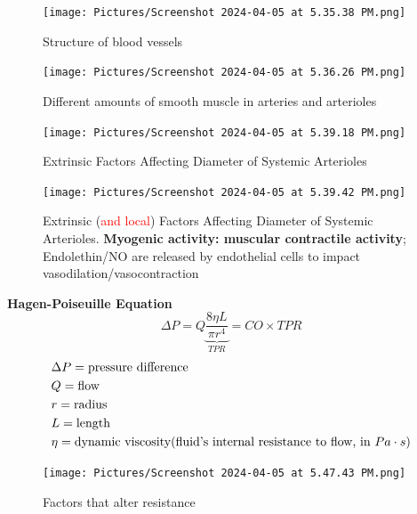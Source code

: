 \documentclass[11pt,fleqn]{book}
\begin{document}
\begin{figure}[h!]
\begin{center}
    \texttt{[image: Pictures/Screenshot 2024-04-05 at 5.35.38 PM.png]}
\end{center}
    \caption{Structure of blood vessels}
\end{figure}

\begin{figure}[h!]
\begin{center}
    \texttt{[image: Pictures/Screenshot 2024-04-05 at 5.36.26 PM.png]}
\end{center}
    \caption{Different amounts of smooth muscle in arteries and arterioles}
\end{figure}

\begin{figure}[h!]
\begin{center}
    \texttt{[image: Pictures/Screenshot 2024-04-05 at 5.39.18 PM.png]}
\end{center}
    \caption{Extrinsic Factors Affecting
Diameter of Systemic Arterioles}
\end{figure}

\begin{figure}[h!]
\begin{center}
    \texttt{[image: Pictures/Screenshot 2024-04-05 at 5.39.42 PM.png]}
\end{center}
    \caption{Extrinsic (\textcolor{red}{and local}) Factors Affecting
Diameter of Systemic Arterioles. \textbf{Myogenic activity: muscular contractile activity}; Endolethin/NO are released by endothelial cells to impact vasodilation/vasocontraction}
\end{figure}
\newpage
\begin{theorem}
    \textbf{Hagen-Poiseuille Equation}
    $$\Delta P=Q\underbrace{\frac{8\eta L}{\pi r^4}}_{TPR}=CO\times TPR$$
    \begin{align*}
        &\Delta P=\text{pressure difference}\\
        &Q=\text{flow}\\
        &r={\rm radius}\\
        &L={\rm length}\\
        &\eta=\text{dynamic viscosity(fluid's internal resistance to flow, in }Pa\cdot s)
    \end{align*}
\end{theorem}

\begin{figure}[h!]
\begin{center}
    \texttt{[image: Pictures/Screenshot 2024-04-05 at 5.47.43 PM.png]}
\end{center}
    \caption{Factors that alter resistance}
\end{figure}
\end{document}
